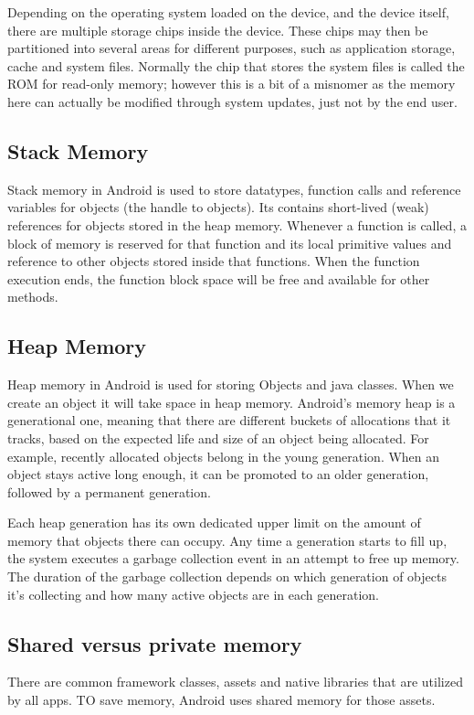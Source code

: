 Depending on the operating system loaded on the device, and the device itself, there are multiple storage chips inside the device. These chips may then be partitioned into several areas for different purposes, such as application storage, cache and system files. Normally the chip that stores the system files is called the ROM for read-only memory; however this is a bit of a misnomer as the memory here can actually be modified through system updates, just not by the end user.

\subsection{Stack Memory}
Stack memory in Android is used to store datatypes, function calls and reference variables for objects (the handle to objects).
Its contains short-lived (weak) references for objects stored in the heap memory. Whenever a function is called, a block of memory is reserved for that function and its local primitive values and reference to other objects stored inside that functions. When the function execution ends, the function block space will be free and available for other methods.

\subsection{Heap Memory}
Heap memory  in Android is used for storing Objects and java classes. When we  create an object it will take space in heap memory. Android’s memory heap is a generational one, meaning that there are different buckets of allocations that it tracks, based on the expected life and size of an object being allocated. For example, recently allocated objects belong in the young generation. When an object stays active long enough, it can be promoted to an older generation, followed by a permanent generation.

Each heap generation has its own dedicated upper limit on the amount of memory that objects there can occupy. Any time a generation starts to fill up, the system executes a garbage collection event in an attempt to free up memory. The duration of the garbage collection depends on which generation of objects it's collecting and how many active objects are in each generation.

\subsection{Shared versus private memory}
There are common framework classes, assets and native libraries that are utilized by all apps. TO save memory, Android uses shared memory for those assets.

